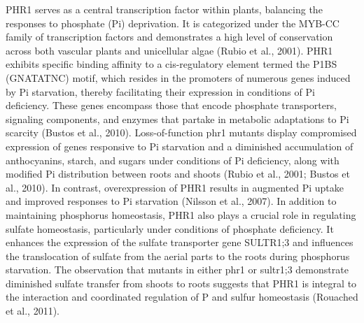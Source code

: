 \documentclass[10pt,letterpaper]{article}
\begin{document}
PHR1 serves as a central transcription factor within plants, balancing the responses to phosphate (Pi) deprivation. It is categorized under the MYB-CC family of transcription factors and demonstrates a high level of conservation across both vascular plants and unicellular algae (Rubio et al., 2001). PHR1 exhibits specific binding affinity to a cis-regulatory element termed the P1BS (GNATATNC) motif, which resides in the promoters of numerous genes induced by Pi starvation, thereby facilitating their expression in conditions of Pi deficiency. These genes encompass those that encode phosphate transporters, signaling components, and enzymes that partake in metabolic adaptations to Pi scarcity (Bustos et al., 2010). Loss-of-function phr1 mutants display compromised expression of genes responsive to Pi starvation and a diminished accumulation of anthocyanins, starch, and sugars under conditions of Pi deficiency, along with modified Pi distribution between roots and shoots (Rubio et al., 2001; Bustos et al., 2010). In contrast, overexpression of PHR1 results in augmented Pi uptake and improved responses to Pi starvation (Nilsson et al., 2007). In addition to maintaining phosphorus homeostasis, PHR1 also plays a crucial role in regulating sulfate homeostasis, particularly under conditions of phosphate deficiency. It enhances the expression of the sulfate transporter gene SULTR1;3 and influences the translocation of sulfate from the aerial parts to the roots during phosphorus starvation. The observation that mutants in either phr1 or sultr1;3 demonstrate diminished sulfate transfer from shoots to roots suggests that PHR1 is integral to the interaction and coordinated regulation of P and sulfur homeostasis (Rouached et al., 2011). 
\end{document}
